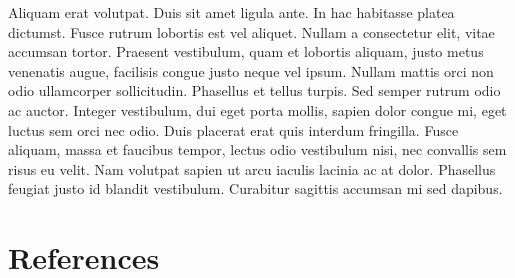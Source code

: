 \begin{refsection}
Aliquam erat volutpat. Duis sit amet ligula ante. In hac habitasse platea dictumst. Fusce rutrum lobortis est vel aliquet. Nullam a consectetur elit, vitae accumsan tortor. Praesent vestibulum, quam et lobortis aliquam, justo metus venenatis augue, facilisis congue justo neque vel ipsum. Nullam mattis orci non odio ullamcorper sollicitudin. Phasellus et tellus turpis. Sed semper rutrum odio ac auctor. Integer vestibulum, dui eget porta mollis, sapien dolor congue mi, eget luctus sem orci nec odio. Duis placerat erat quis interdum fringilla. Fusce aliquam, massa et faucibus tempor, lectus odio vestibulum nisi, nec convallis sem risus eu velit. Nam volutpat sapien ut arcu iaculis lacinia ac at dolor. Phasellus feugiat justo id blandit vestibulum. Curabitur sagittis accumsan mi sed dapibus.

\newpage
\section{References}
\RemoveLabels

\printbibliography[heading=none]

\end{refsection}
